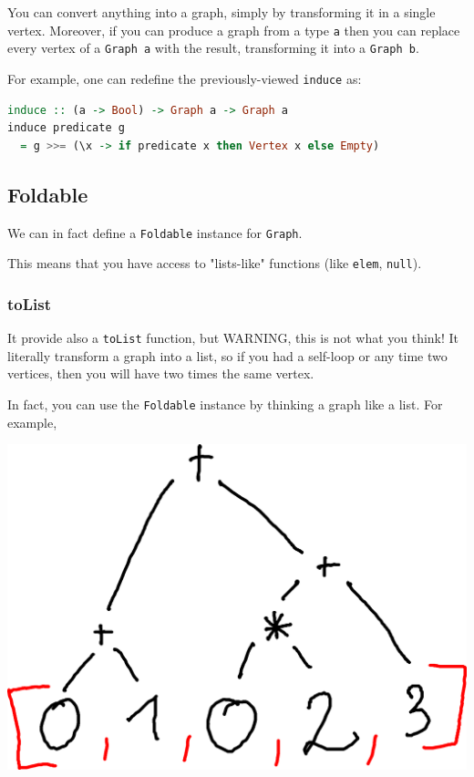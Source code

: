 \documentclass[10pt,a4paper]{article}
\begin{document}
You can convert anything into a graph, simply by transforming it in a single vertex. Moreover, if you can produce a graph from a type \verb|a| then you can replace every vertex of a \verb|Graph a| with the result, transforming it into a \verb|Graph b|.

For example, one can redefine the previously-viewed \verb|induce| as:

\begin{lstlisting}[language=Haskell, frame=single]
induce :: (a -> Bool) -> Graph a -> Graph a
induce predicate g
  = g >>= (\x -> if predicate x then Vertex x else Empty)
\end{lstlisting}

\subsection{Foldable}
We can in fact define a \verb|Foldable| instance for \verb|Graph|.

This means that you have access to "lists-like" functions (like \verb|elem|, \verb|null|). 

\subsubsection{toList}
It provide also a \verb|toList| function, but WARNING, this is not what you think! It literally transform a graph into a list, so if you had a self-loop or any time two vertices, then you will have two times the same vertex.

In fact, you can use the \verb|Foldable| instance by thinking a graph like a list. For example, 

\begin{center}
	\includegraphics[scale=0.5]{figspng/foldable.png}
\end{center}
\end{document}
